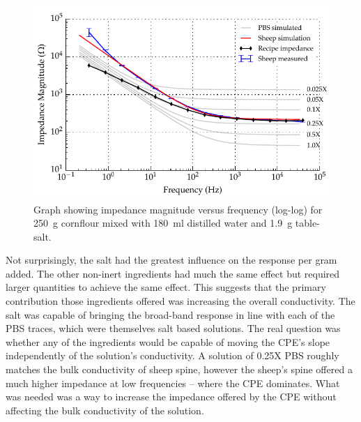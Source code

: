   \begin{figure}
    \centering
    \includegraphics[width=\textwidth]{content/pt2/graphics/run14_180ml-distilledWater_250g-cornflour_1g9-salt_ZVsF_graph_mag}
    \caption{\label{fig:recipe_cornflour_salt_extraWater_mag}Graph showing impedance magnitude versus frequency (log-log) for \SI{250}{\gram} cornflour mixed with \SI{180}{\milli\litre} distilled water and \SI{1.9}{\gram} table-salt.}
  \end{figure}

  Not surprisingly, the salt had the greatest influence on the response per gram added.
  The other non-inert ingredients had much the same effect but required larger quantities to achieve the same effect.
  This suggests that the primary contribution those ingredients offered was increasing the overall conductivity.
  The salt was capable of bringing the broad-band response in line with each of the PBS traces, which were themselves salt based solutions.
  The real question was whether any of the ingredients would be capable of moving the CPE's slope independently of the solution's conductivity.
  A solution of 0.25X PBS roughly matches the bulk conductivity of sheep spine, however the sheep's spine offered a much higher impedance at low frequencies -- where the CPE dominates.
  What was needed was a way to increase the impedance offered by the CPE without affecting the bulk conductivity of the solution.

